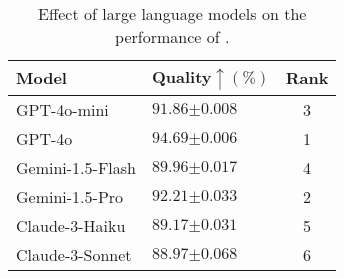 \begin{table}[h]
    \vspace{-1mm}
    \centering
    \begin{tabularx}{\linewidth}{>{\centering\arraybackslash}X | >{\centering\arraybackslash}X | c}
        \toprule
        \textbf{Model} & \textbf{Quality$\uparrow (\%)$} & \textbf{Rank} \\
        \midrule
        GPT-4o-mini       & $91.86${\tiny$\pm 0.008$}   & 3 \\
        GPT-4o            & $94.69${\tiny$\pm 0.006$}  & 1 \\
        Gemini-1.5-Flash  & $89.96${\tiny$\pm 0.017$}  & 4 \\
        Gemini-1.5-Pro    & $92.21${\tiny$\pm 0.033$}  & 2 \\
        Claude-3-Haiku    & $89.17${\tiny$\pm 0.031$}  & 5 \\
        Claude-3-Sonnet   & $88.97${\tiny$\pm 0.068$}  & 6 \\
        \bottomrule
    \end{tabularx}
    \caption{Effect of large language models on the performance of \modelname.}
    \vspace{-1em}
    \label{tbl:ablation_model}
\end{table}